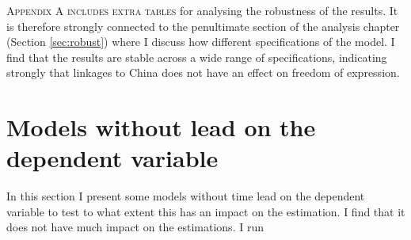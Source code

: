 \lettrine{A}{ppendix A includes extra tables} for analysing the robustness of the results. It is therefore strongly connected to the penultimate section of the analysis chapter (Section \ref{sec:robust}) where I discuss how different specifications of the model. I find that the results are stable across a wide range of specifications, indicating strongly that linkages to China does not have an effect on freedom of expression.

\section{Models without lead on the dependent variable}
In this section I present some models without time lead on the dependent variable to test to what extent this has an impact on the estimation. I find that it does not have much impact on the estimations. I run 


